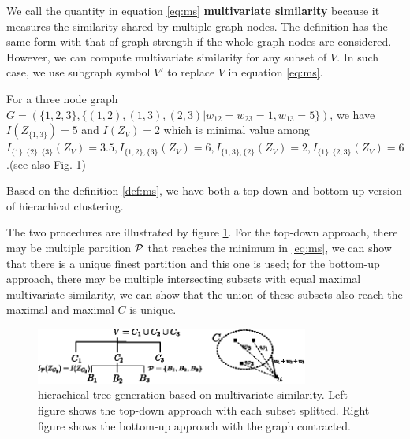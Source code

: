 \documentclass{article}
\begin{document}
We call the quantity in equation \eqref{eq:ms} \textbf{multivariate similarity} because it measures the similarity shared by multiple graph nodes. The definition has the same form with that of graph strength if  the whole graph nodes are considered\cite{RN12}. However, we can compute multivariate similarity for any subset of $V$. In such case, 
we use subgraph symbol $V'$ to replace $V$ in equation \eqref{eq:ms}.
\begin{example}\label{eg:three}
For a three node graph $G=(\{1,2,3\},\{(1,2),(1,3),(2,3)| w_{12}=w_{23}=1, w_{13}=5\})$, we have $I(Z_{\{1,3\}}) = 5$ and $I(Z_V) = 2$ which is minimal value among $I_{\{1\},\{2\},\{3\}}(Z_V)=3.5, I_{\{1, 2\},\{3\}}(Z_V)=6, I_{\{1,3\},\{2\}}(Z_V)=2, I_{\{1\},\{2,3\}}(Z_V)=6$.(see also \cite{RN9} Fig. 1)
\end{example}

Based on the definition \eqref{def:ms}, we have both a top-down and bottom-up version of hierachical clustering.


The two procedures are illustrated by figure \ref{fig:ta}. For the top-down approach, there may be multiple partition $\P$ that reaches the minimum in \eqref{eq:ms}, we can show that there is a unique finest partition and this one is used; for the bottom-up approach, there may be multiple intersecting subsets with equal maximal multivariate similarity, we can show that the union of these subsets also reach the maximal and maximal $C$ is unique.
\begin{figure}
\centering
\includegraphics[width=0.8\textwidth]{pic/two_approach.eps}
\caption{hierachical tree generation based on multivariate similarity. Left figure shows the top-down approach with each subset splitted. Right figure shows the bottom-up approach with the graph contracted.}\label{fig:ta}
\end{figure}
\end{document}
